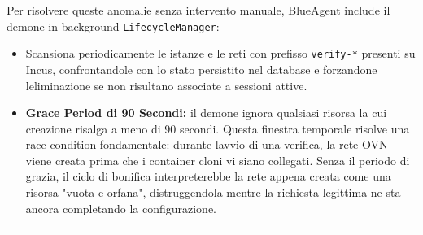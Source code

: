 Per risolvere queste anomalie senza intervento manuale, BlueAgent
include il demone in background
\passthrough{\lstinline!LifecycleManager!}:

\begin{itemize}
\tightlist
\item
  Scansiona periodicamente le istanze e le reti con prefisso
  \passthrough{\lstinline!verify-*!} presenti su Incus, confrontandole
  con lo stato persistito nel database e forzandone
  l\textquotesingle eliminazione se non risultano associate a sessioni
  attive.
\item
  \textbf{Grace Period di 90 Secondi:} il demone ignora qualsiasi
  risorsa la cui creazione risalga a meno di 90 secondi. Questa finestra
  temporale risolve una race condition fondamentale: durante
  l\textquotesingle avvio di una verifica, la rete OVN viene creata
  prima che i container cloni vi siano collegati. Senza il periodo di
  grazia, il ciclo di bonifica interpreterebbe la rete appena creata
  come una risorsa "vuota e orfana", distruggendola mentre la richiesta
  legittima ne sta ancora completando la configurazione.
\end{itemize}

\begin{center}\rule{0.5\linewidth}{0.5pt}\end{center}
